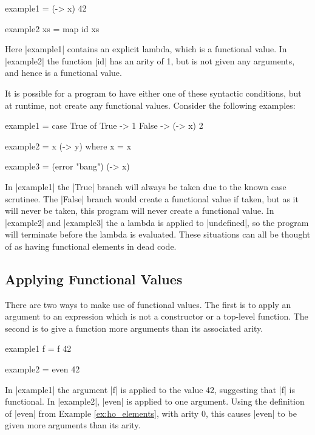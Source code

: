 \documentclass[preprint]{sigplanconf}
\begin{document}
\begin{example}
\begin{code}
example1 = (\x -> x) 42

example2 xs = map id xs
\end{code}

Here |example1| contains an explicit lambda, which is a functional value. In |example2| the function |id| has an arity of 1, but is not given any arguments, and hence is a functional value.
\end{example}

It is possible for a program to have either one of these syntactic conditions, but at runtime, not create any functional values. Consider the following examples:

\begin{code}
example1 = case  True of
                 True   -> 1
                 False  -> (\x -> x) 2

example2 = x (\y -> y)
    where x = x

example3 = (error "bang") (\x -> x)
\end{code}

In |example1| the |True| branch will always be taken due to the known case scrutinee. The |False| branch would create a functional value if taken, but as it will never be taken, this program will never create a functional value. In |example2| and |example3| the a lambda is applied to |undefined|, so the program will terminate before the lambda is evaluated. These situations can all be thought of as having functional elements in dead code.


\subsection{Applying Functional Values}

There are two ways to make use of functional values. The first is to apply an argument to an expression which is not a constructor or a top-level function. The second is to give a function more arguments than its associated arity.

\begin{example}
\begin{code}
example1 f = f 42

example2 = even 42
\end{code}

In |example1| the argument |f| is applied to the value 42, suggesting that |f| is functional. In |example2|, |even| is applied to one argument. Using the definition of |even| from Example \ref{ex:ho_elements}, with arity 0, this causes |even| to be given more arguments than its arity.
\end{example}
\end{document}
